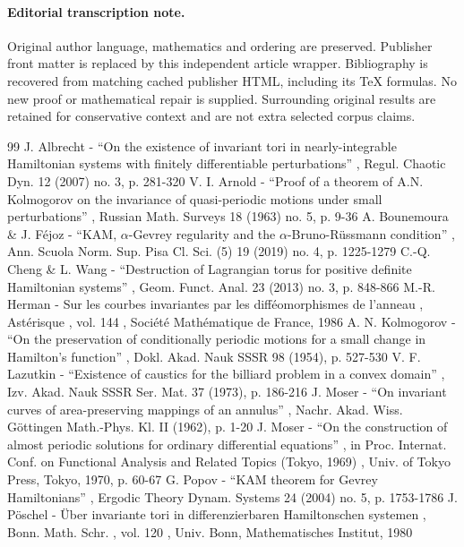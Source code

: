 \documentclass[11pt]{article}
\begin{document}
\paragraph{Editorial transcription note.}
Original author language, mathematics and ordering are preserved. Publisher front matter is replaced by this independent article wrapper. Bibliography is recovered from matching cached publisher HTML, including its TeX formulas. No new proof or mathematical repair is supplied. Surrounding original results are retained for conservative context and are not extra selected corpus claims.
\clearpage

\begin{thebibliography}{99}
 J. Albrecht - “On the existence of invariant tori in nearly-integrable Hamiltonian systems with finitely differentiable perturbations” , Regul. Chaotic Dyn. 12 (2007) no. 3, p. 281-320
 V. I. Arnold - “Proof of a theorem of A.N. Kolmogorov on the invariance of quasi-periodic motions under small perturbations” , Russian Math. Surveys 18 (1963) no. 5, p. 9-36
 A. Bounemoura \& J. Féjoz - “KAM, $\alpha $-Gevrey regularity and the $\alpha $-Bruno-Rüssmann condition” , Ann. Scuola Norm. Sup. Pisa Cl. Sci. (5) 19 (2019) no. 4, p. 1225-1279
 C.-Q. Cheng \& L. Wang - “Destruction of Lagrangian torus for positive definite Hamiltonian systems” , Geom. Funct. Anal. 23 (2013) no. 3, p. 848-866
 M.-R. Herman - Sur les courbes invariantes par les difféomorphismes de l’anneau , Astérisque , vol. 144 , Société Mathématique de France, 1986
 A. N. Kolmogorov - “On the preservation of conditionally periodic motions for a small change in Hamilton’s function” , Dokl. Akad. Nauk SSSR 98 (1954), p. 527-530
 V. F. Lazutkin - “Existence of caustics for the billiard problem in a convex domain” , Izv. Akad. Nauk SSSR Ser. Mat. 37 (1973), p. 186-216
 J. Moser - “On invariant curves of area-preserving mappings of an annulus” , Nachr. Akad. Wiss. Göttingen Math.-Phys. Kl. II (1962), p. 1-20
 J. Moser - “On the construction of almost periodic solutions for ordinary differential equations” , in Proc. Internat. Conf. on Functional Analysis and Related Topics (Tokyo, 1969) , Univ. of Tokyo Press, Tokyo, 1970, p. 60-67
 G. Popov - “KAM theorem for Gevrey Hamiltonians” , Ergodic Theory Dynam. Systems 24 (2004) no. 5, p. 1753-1786
 J. Pöschel - Über invariante tori in differenzierbaren Hamiltonschen systemen , Bonn. Math. Schr. , vol. 120 , Univ. Bonn, Mathematisches Institut, 1980

\end{thebibliography}
\end{document}
